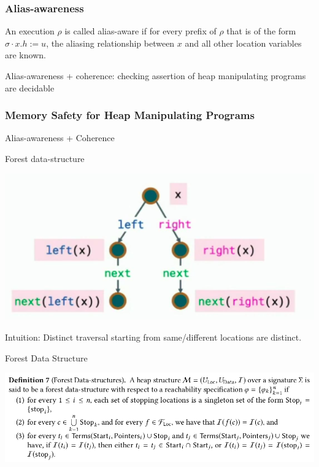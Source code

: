 \documentclass[aspectratio=1610, 13pt]{beamer}
\begin{document}
\begin{frame}\frametitle{Alias-awareness}
\begin{definition}
An execution $\rho$ is called alias-aware if for every prefix of $\rho$ that is of the form $\sigma \cdot x.h := u$, the aliasing relationship between $x$ and all other location variables are known.

\end{definition}


Alias-awareness + coherence: checking assertion of heap manipulating programs are decidable


\end{frame}

\begin{frame}\frametitle{Memory Safety for Heap Manipulating Programs}
\begin{center}
Alias-awareness + Coherence
\end{center}
Forest data-structure
\begin{center}
\includegraphics[scale=0.33]{forest_pic.png}
\end{center}
Intuition: Distinct traversal starting from same/different locations are distinct.




\end{frame}

\begin{frame}{Forest Data Structure}
\begin{center}
\includegraphics[scale=0.4]{forest_def.png}
\end{center}
\end{frame}
\end{document}

